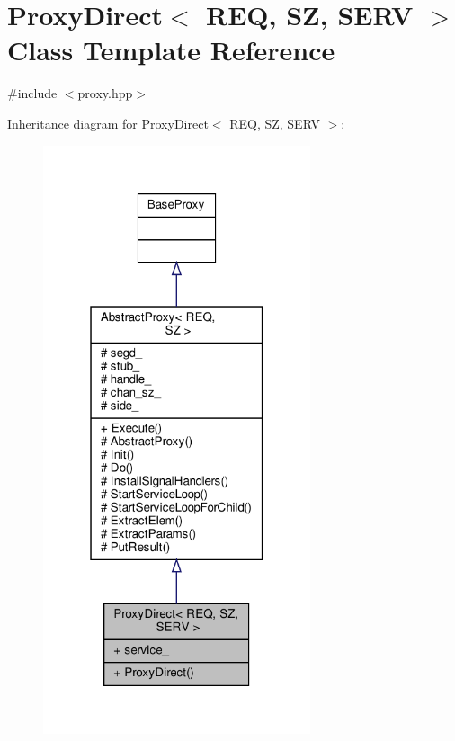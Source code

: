 \hypertarget{classProxyDirect}{}\section{Proxy\+Direct$<$ R\+EQ, SZ, S\+E\+RV $>$ Class Template Reference}
\label{classProxyDirect}


{\ttfamily \#include $<$proxy.\+hpp$>$}



Inheritance diagram for Proxy\+Direct$<$ R\+EQ, SZ, S\+E\+RV $>$\+:
\nopagebreak
\begin{figure}[H]
\begin{center}
\leavevmode
\includegraphics[width=223pt]{classProxyDirect__inherit__graph}
\end{center}
\end{figure}


